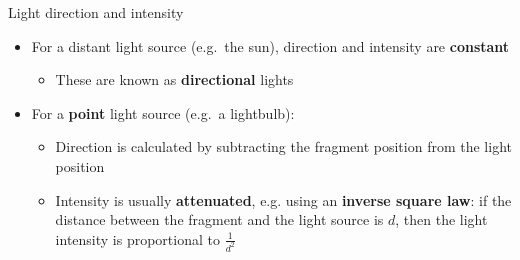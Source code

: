 \begin{frame}{Light direction and intensity}
	\begin{itemize}
		\pause\item For a distant light source (e.g.\ the sun), direction and intensity are \textbf{constant}
		\begin{itemize}
			\pause\item These are known as \textbf{directional} lights
		\end{itemize}
		\pause\item For a \textbf{point} light source (e.g.\ a lightbulb):
			\begin{itemize}
				\pause\item Direction is calculated by subtracting the fragment position from the light position
				\pause\item Intensity is usually \textbf{attenuated}, e.g. using an \textbf{inverse square law}: if the distance between the fragment and the light source is $d$, then the light intensity is proportional to $\frac{1}{d^2}$
			\end{itemize}
	\end{itemize}
\end{frame}

